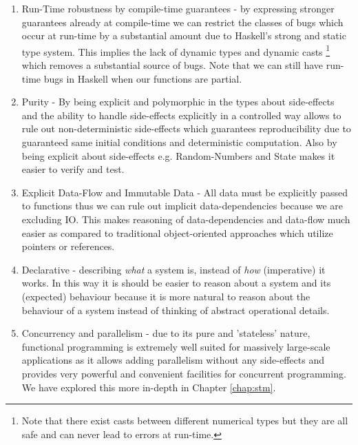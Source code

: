 \begin{enumerate}
	\item Run-Time robustness by compile-time guarantees - by expressing stronger guarantees already at compile-time we can restrict the classes of bugs which occur at run-time by a substantial amount due to Haskell's strong and static type system.  This implies the lack of dynamic types and dynamic casts \footnote{Note that there exist casts between different numerical types but they are all safe and can never lead to errors at run-time.} which removes a substantial source of bugs.  Note that we can still have run-time bugs in Haskell when our functions are partial.
	\item Purity - By being explicit and polymorphic in the types about side-effects and the ability to handle side-effects explicitly in a controlled way allows to rule out non-deterministic side-effects which guarantees reproducibility due to guaranteed same initial conditions and deterministic computation. Also by being explicit about side-effects e.g. Random-Numbers and State makes it easier to verify and test.
	\item Explicit Data-Flow and Immutable Data - All data must be explicitly passed to functions thus we can rule out implicit data-dependencies because we are excluding IO. This makes reasoning of data-dependencies and data-flow much easier as compared to traditional object-oriented approaches which utilize pointers or references.
	\item Declarative - describing \textit{what} a system is, instead of \textit{how} (imperative) it works. In this way it is should be easier to reason about a system and its (expected) behaviour because it is more natural to reason about the behaviour of a system instead of thinking of abstract operational details.
	\item Concurrency and parallelism - due to its pure and 'stateless' nature, functional programming is extremely well suited for massively large-scale applications as it allows adding parallelism without any side-effects and provides very powerful and convenient facilities for concurrent programming. We have explored this more in-depth in Chapter \ref{chap:stm}.
\end{enumerate}


